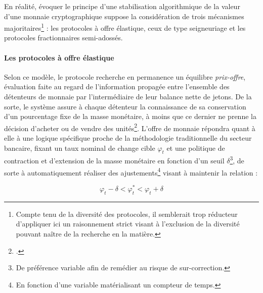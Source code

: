 {En réalité, évoquer le principe d'une stabilisation algorithmique de la valeur d'une monnaie cryptographique suppose la considération de trois mécanismes majoritaires\footnote{Compte tenu de la diversité des protocoles, il semblerait trop réducteur d'appliquer ici un raisonnement strict visant à l'exclusion de la diversité pouvant naître de la recherche en la matière.} : les protocoles à offre élastique, ceux de type seigneuriage et les protocoles fractionnaires semi-adossés.\par

\paragraph{Les protocoles à offre élastique}

Selon ce modèle, le protocole recherche en permanence un équilibre \emph{prix-offre}, évaluation faite au regard de l'information propagée entre l'ensemble des détenteurs de monnaie par l'intermédiaire de leur balance nette de jetons. De la sorte, le système assure à chaque détenteur la connaissance de sa conservation d'un pourcentage fixe de la masse monétaire, à moins que ce dernier ne prenne la décision d'acheter ou de vendre des unités\footnote{.}. L'offre de monnaie répondra quant à elle à une logique spécifique proche de la méthodologie traditionnelle du secteur bancaire, fixant un taux nominal de change cible $\varphi_{t}$ et une politique de contraction et d'extension de la masse monétaire en fonction d'un seuil $\delta$\footnote{De préférence variable afin de remédier au risque de sur-correction.}, de sorte à automatiquement réaliser des ajustements\footnote{En fonction d'une variable matérialisant un compteur de temps.} visant à maintenir la relation :\par
\[  \varphi_t - \delta <  \varphi_{t}^* < \varphi_t + \delta \]
}
